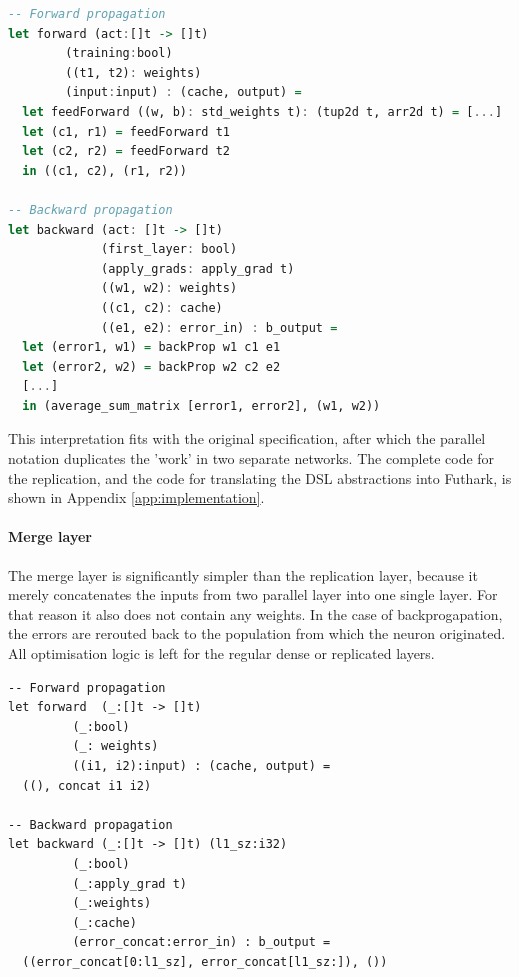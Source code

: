 \begin{lstlisting}[language=Haskell,label={code:bp-replicate},caption={Part
    of the forward and backward propagation algorithms for the replicate layer.
Abbreviated for clarity.}]
-- Forward propagation
let forward (act:[]t -> []t)
	    (training:bool)
	    ((t1, t2): weights)
	    (input:input) : (cache, output) =
  let feedForward ((w, b): std_weights t): (tup2d t, arr2d t) = [...]
  let (c1, r1) = feedForward t1
  let (c2, r2) = feedForward t2
  in ((c1, c2), (r1, r2))

-- Backward propagation
let backward (act: []t -> []t)
             (first_layer: bool)
             (apply_grads: apply_grad t)
             ((w1, w2): weights)
             ((c1, c2): cache)
             ((e1, e2): error_in) : b_output =
  let (error1, w1) = backProp w1 c1 e1
  let (error2, w2) = backProp w2 c2 e2
  [...]
  in (average_sum_matrix [error1, error2], (w1, w2))
\end{lstlisting}

This interpretation fits with the original specification, after which
the parallel notation duplicates the 'work' in two separate networks.
The complete code for the replication, and the code for translating the \gls{DSL}
abstractions into Futhark, is shown in Appendix 
\ref{app:implementation}.

\paragraph{Merge layer}
The merge layer is significantly simpler than the replication layer,
because it merely concatenates the inputs from two parallel layer into one single
layer. 
For that reason it also does not contain any weights.
In the case of backprogapation, the errors are rerouted back to
the population from which the neuron originated.
All optimisation logic is left for the regular dense or replicated
layers.

\begin{lstlisting}[caption={Functions for forward and backward propagation in
the merge layer.}]
-- Forward propagation
let forward  (_:[]t -> []t)
	     (_:bool)
	     (_: weights)
	     ((i1, i2):input) : (cache, output) =
  ((), concat i1 i2)

-- Backward propagation
let backward (_:[]t -> []t) (l1_sz:i32)
	     (_:bool)
	     (_:apply_grad t)
	     (_:weights)
	     (_:cache)
	     (error_concat:error_in) : b_output =
  ((error_concat[0:l1_sz], error_concat[l1_sz:]), ())
\end{lstlisting}

